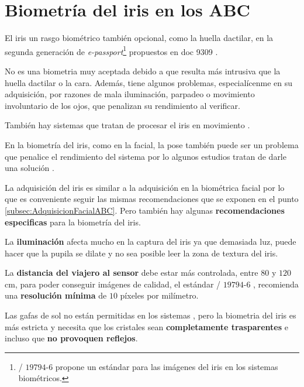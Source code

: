 \section{Biometría del iris en los ABC}\label{sec:BiometriaIrisABC}

El \gls{iris} un rasgo biométrico también opcional, como la huella dactilar, en la segunda generación de \textit{\gls{e-passport}}\footnote{/ $19794$-$6$ \cite{ISO/Iris} propone un estándar para las imágenes del \gls{iris} en los sistemas biométricos.} propuestos en  doc 9309 \cite{doc20069303}.  

No es una \gls{biometria} muy aceptada debido a que resulta más intrusiva que la huella dactilar o la cara. Además, tiene algunos problemas, especialícenme en su adquisición, por razones de mala iluminación, parpadeo o movimiento involuntario de los ojos, que penalizan su rendimiento al verificar. 

\color{red} También hay sistemas que tratan de procesar el \gls{iris} en movimiento \cite{matey2006iris}. \color{black}

En la biometría del \gls{iris}, como en la \gls{facial}, la pose también puede ser un problema que penalice el rendimiento del sistema por lo algunos estudios tratan de darle una solución \cite{chou2009non}. 

La adquisición del \gls{iris} es similar a la adquisición en la biométrica facial por lo que es conveniente seguir las mismas recomendaciones que se exponen en el punto \ref{subsec:AdquisicionFacialABC}. Pero también hay algunas \textbf{recomendaciones especificas} para la biometría del \gls{iris}.

La \textbf{iluminación} afecta mucho en la captura del \gls{iris} ya que demasiada luz, puede hacer que la pupila se dilate y no sea posible leer la zona de textura del \gls{iris}.

La \textbf{distancia del viajero al sensor} debe estar más controlada, entre $80$ y $120$ cm, para poder conseguir imágenes de calidad, el estándar / $19794$-$6$ \cite{ISO/Iris}, recomienda una \textbf{resolución mínima} de $10$ píxeles por milímetro.  

Las gafas de sol no están permitidas en los sistemas , pero la \gls{biometria} del \gls{iris} es más estricta y necesita que los cristales sean \textbf{completamente trasparentes} e incluso que \textbf{no provoquen reflejos}. 

